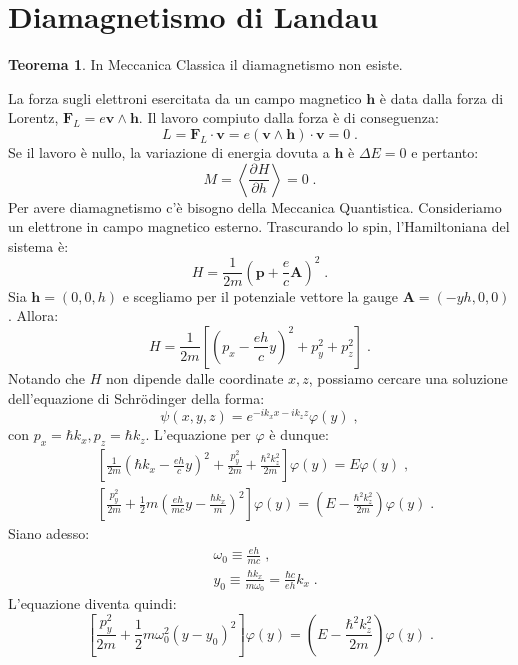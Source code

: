 \documentclass[10pt,a4paper]{report}
\theoremstyle{definition}
\newtheorem{thm}{Teorema}[section]
\newcommand{\pdev}[3][]{\frac{\partial^{#1} #2}{\partial #3^{#1}}}
\numberwithin{equation}{section}
\newcommand{\Sch}{Schrödinger}
\begin{document}
\section{Diamagnetismo di Landau}
\begin{thm} In Meccanica Classica il diamagnetismo non esiste.
\end{thm}
\proof La forza sugli elettroni esercitata da un campo magnetico $\mathbf{h}$ è data dalla forza di Lorentz, $\mathbf{F}_L=e\mathbf{v}\wedge\mathbf{h}$. Il lavoro compiuto dalla forza è di conseguenza:
$$
L=\mathbf{F}_L\cdot\mathbf{v}=e(\mathbf{v}\wedge\mathbf{h})\cdot\mathbf{v}=0\;.
$$
Se il lavoro è nullo, la variazione di energia dovuta a $\mathbf{h}$ è $\Delta E=0$ e pertanto:
$$
M=\left\langle\pdev{H}{h}\right\rangle=0\;.
$$
\endproof
Per avere diamagnetismo c'è bisogno della Meccanica Quantistica. Consideriamo un elettrone in campo magnetico esterno. Trascurando lo spin, l'Hamiltoniana del sistema è:
\begin{equation}
H=\frac{1}{2m}\left(\mathbf{p}+\frac{e}{c}\mathbf{A}\right)^2\;.
\end{equation}
Sia $\mathbf{h}=(0,0,h)$ e scegliamo per il potenziale vettore la gauge $\mathbf{A}=(-yh,0,0)$. Allora:
\begin{equation}
H=\frac{1}{2m}\left[\left(p_x-\frac{eh}{c}y\right)^2+p_y^2+p_z^2\right]\;.
\end{equation}
Notando che $H$ non dipende dalle coordinate $x,z$, possiamo cercare una soluzione dell'equazione di \Sch\; della forma:
\begin{equation}
\psi(x,y,z)=e^{-ik_xx-ik_zz}\varphi(y)\;,
\end{equation}
con $p_x=\hbar k_x,p_z=\hbar k_z$. L'equazione per $\varphi$ è dunque:
\begin{align*}
&\left[\frac{1}{2m}\left(\hbar k_x-\frac{eh}{c}y\right)^2+\frac{p_y^2}{2m}+\frac{\hbar^2k_z^2}{2m}\right]\varphi(y)=E\varphi(y)\;, \\
&\left[\frac{p_y^2}{2m}+\frac{1}{2}m\left(\frac{eh}{mc}y-\frac{\hbar k_x}{m}\right)^2\right]\varphi(y)=\left(E-\frac{\hbar^2k_z^2}{2m}\right)\varphi(y)\;.
\end{align*}
Siano adesso:
\begin{align}
&\omega_0\equiv \frac{eh}{mc}\;, \\
&y_0\equiv \frac{\hbar k_x}{m\omega_0}=\frac{\hbar c}{eh}k_x\;.
\end{align}
L'equazione diventa quindi:
\begin{equation}
\left[\frac{p_y^2}{2m}+\frac{1}{2}m\omega_0^2(y-y_0)^2\right]\varphi(y)=\left(E-\frac{\hbar^2 k_z^2}{2m}\right)\varphi(y)\;.
\end{equation}
\end{document}
